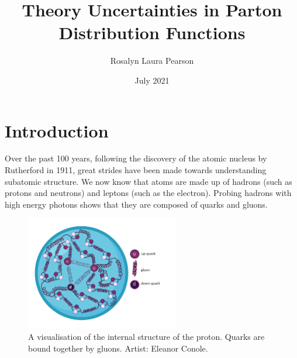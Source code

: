 \documentclass[a4paper,12pt,oneside,openright]{book}
\title{Theory Uncertainties in Parton Distribution Functions}
\author{Rosalyn Laura Pearson}
\date{July 2021} %
\numberwithin{equation}{section}
\numberwithin{figure}{section}
\numberwithin{table}{section}
\begin{document}
\singlespacing
\maketitlepage
\frontmatter
\eighteenptleading


\singlespacing
\makedeclaration



\tableofcontents

\cleardoublepage
{}
{}
\setcounter{tocdepth}{2}

\cleardoublepage
{}
{}
\listoffigures

\cleardoublepage
{}
{}
\listoftables

\section*{Introduction} %
Over the past 100 years, following the discovery of the atomic nucleus by Rutherford in 1911, great
strides have been made towards understanding subatomic structure. We now know that atoms are made up of hadrons (such as protons and neutrons) and leptons
(such as the electron). Probing hadrons with high energy photons shows that
they are composed of quarks and gluons.
\begin{figure}[H]
\centering
\includegraphics[width=0.6\textwidth]{proton.pdf}
\caption{A visualisation of the internal structure of the proton. Quarks are bound together by gluons. Artist: Eleanor Conole.\label{fig:proton}}
\end{figure}
\end{document}
